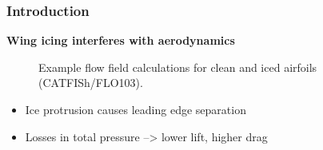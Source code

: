 \documentclass[9pt]{beamer}
\begin{document}
\begin{frame}
\frametitle{Introduction}
\label{sec-1-3}

\textbf{Wing icing interferes with aerodynamics}
\begin{figure}
   \caption{Example flow field calculations for clean and iced airfoils (CATFISh/FLO103).}
\end{figure}

\begin{itemize}
\item Ice protrusion causes leading edge separation
\item Losses in total pressure --> lower lift, higher drag
\end{itemize}
\end{frame}
\end{document}
